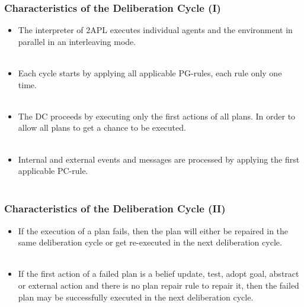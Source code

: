 \documentclass{beamer}
\begin{document}

\begin{frame}
\frametitle{Characteristics of the Deliberation Cycle (I)}
  \begin{itemize}
  
      \item The interpreter of 2APL executes individual agents and the environment in
parallel in an interleaving mode.\\~\\
      
      \item Each cycle starts by applying all applicable PG-rules, each rule only one time. \\~\\
      
      \item The DC proceeds by executing only the first actions of all plans. In order to allow all plans to get a chance to be executed. \\~\\
      
      \item  Internal and external events and messages are processed by applying the first applicable PC-rule. \\~\\
      
  \end{itemize}
\end{frame}

\begin{frame}
\frametitle{Characteristics of the Deliberation Cycle (II)}
  \begin{itemize}
  
     \item If the execution of a plan fails, then the plan will either be repaired in the same
deliberation cycle or get re-executed in the next deliberation cycle. \\~\\

	\item If the first action of a failed plan is a belief update, test, adopt
goal, abstract or external action and there is no plan repair rule to
repair it, then the failed plan may be successfully executed in the next deliberation cycle. \\~\\

  \end{itemize}
\end{frame}
\end{document}
